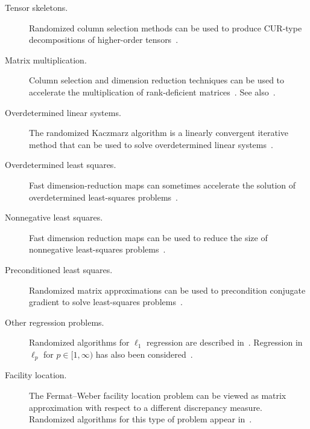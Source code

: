 \documentclass[final]{siamltex}
\newcounter{algorithm}[section]
\newcommand{\pgnotate}[1]{{\color{blue}[#1]}}
\begin{document}
\begin{description}
\item[Tensor skeletons.]
Randomized column selection methods can be used to produce CUR-type
decompositions of higher-order
tensors~\cite{DM07:Randomized-Algorithm}.

\item[Matrix multiplication.]
Column selection and dimension reduction techniques can be used to
accelerate the multiplication of rank-deficient
matrices~\cite{DKM06:Fast-Monte-Carlo-I,Sar06:Improved-Approximation}.
See also~\cite{BW08:Sparse-Representation}.

\item[Overdetermined linear systems.]
The randomized Kaczmarz algorithm is a linearly convergent iterative
method that can be used to solve overdetermined linear
systems~\cite{Nee09:Randomized-Kaczmarz,SV08:Randomized-Kaczmarz}.

\item[Overdetermined least squares.]
Fast dimension-reduction maps can sometimes accelerate the solution
of overdetermined least-squares
problems~\cite{DMMS09:Faster-Least,Sar06:Improved-Approximation}.

\item[Nonnegative least squares.]
Fast dimension reduction maps can be used to reduce the size of
nonnegative least-squares problems~\cite{BD09:Random-Projections}.

\item[Preconditioned least squares.]
Randomized matrix approximations can be used to precondition
conjugate gradient to solve least-squares
problems~\cite{2008_rokhlin_leastsquares}.

\item[Other regression problems.]
Randomized algorithms for $\ell_1$ regression are described
in~\cite{Cla05:Subgradient-Sampling}.  Regression in $\ell_p$ for $p
\in [1, \infty)$ has also been
considered~\cite{DDHKM09:Sampling-Algorithms}.

\item[Facility location.]
The Fermat--Weber facility location problem can be viewed as matrix
approximation with respect to a different discrepancy measure.
Randomized algorithms for this type of problem appear
in~\cite{SV07:Efficient-Subspace}.
\end{description}

\end{document}
